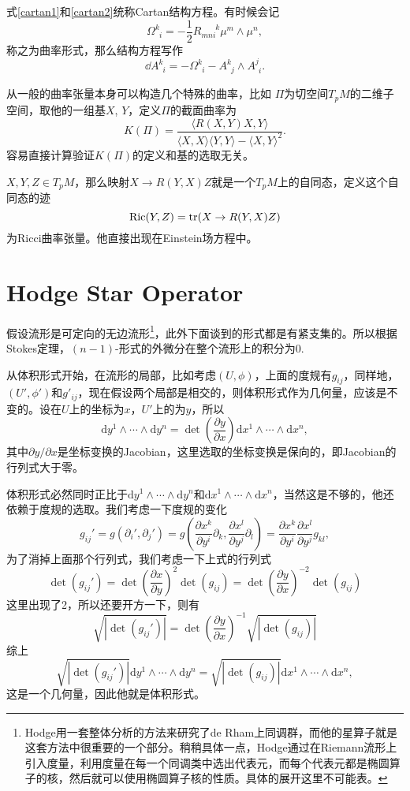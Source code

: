 式\eqref{cartan1}和\eqref{cartan2}统称Cartan结构方程。有时候会记
\[
	\Omega^{k}_{\phantom{k}i}=-\frac{1}{2}R_{mni}^{\phantom{mni}k} \mu^m\wedge\mu^n,
\]
称之为曲率形式，那么结构方程写作
\[
	\dd A^{k}_{\phantom{k}i}=-\Omega^{k}_{\phantom{k}i}-A^{k}_{\phantom{k}j}\wedge A^{j}_{\phantom{j}i}.
\]

从一般的曲率张量本身可以构造几个特殊的曲率，比如
\para $\Pi$为切空间$T_pM$的二维子空间，取他的一组基$X$, $Y$，定义$\Pi$的截面曲率为
\[
	K(\Pi)=\frac{\langle R(X,Y)X,Y\rangle}{\langle X,X\rangle\langle Y,Y \rangle-\langle X,Y \rangle^2}.
\]
容易直接计算验证$K(\Pi)$的定义和基的选取无关。

\para $X,Y,Z\in T_p M$，那么映射$X\to R(Y,X)Z$就是一个$T_p M$上的自同态，定义这个自同态的迹
\[
	\mathrm{Ric}(Y,Z)=\operatorname{tr} (X\to R(Y,X)Z)
\]
为Ricci曲率张量。他直接出现在Einstein场方程中。

\section{Hodge Star Operator}
假设流形是可定向的无边流形\footnote{Hodge用一套整体分析的方法来研究了de Rham上同调群，而他的星算子就是这套方法中很重要的一个部分。稍稍具体一点，Hodge通过在Riemann流形上引入度量，利用度量在每一个同调类中选出代表元，而每个代表元都是椭圆算子的核，然后就可以使用椭圆算子核的性质。具体的展开这里不可能表。}，此外下面谈到的形式都是有紧支集的。所以根据Stokes定理，$(n-1)$-形式的外微分在整个流形上的积分为0.

从体积形式开始，在流形的局部，比如考虑$(U,\phi)$，上面的度规有$g_{ij}$，同样地，$(U',\phi')$和$g'_{ij}$，现在假设两个局部是相交的，则体积形式作为几何量，应该是不变的。设在$U$上的坐标为$x$，$U'$上的为$y$，所以
\[
	\mathrm{d}y^1\wedge \cdots \wedge\mathrm{d}y^n=\det\left(\frac{\partial y}{\partial x}\right)\mathrm{d}x^1\wedge \cdots \wedge \mathrm{d}x^n,
\]
其中$\partial y/\partial x$是坐标变换的Jacobian，这里选取的坐标变换是保向的，即Jacobian的行列式大于零。

体积形式必然同时正比于$\mathrm{d}y^1\wedge \cdots \wedge \mathrm{d}y^n$和$\mathrm{d}x^1\wedge \cdots \wedge \mathrm{d}x^n$，当然这是不够的，他还依赖于度规的选取。我们考虑一下度规的变化
\[
	g_{ij}'=g(\partial_i',\partial_j')=g\left(\frac{\partial x^k}{\partial y^i}\partial_k,\frac{\partial x^l}{\partial y^j}\partial_l\right)=\frac{\partial x^k}{\partial y^i}\frac{\partial x^l}{\partial y^j}g_{kl},
\]
为了消掉上面那个行列式，我们考虑一下上式的行列式
\[
	\det(g_{ij}')=\det\left(\frac{\partial x}{\partial y}\right)^2\det(g_{ij})=\det\left(\frac{\partial y}{\partial x}\right)^{-2}\det(g_{ij})
\]
这里出现了2，所以还要开方一下，则有
\[
	\sqrt{|\det(g_{ij}')|}=\det\left(\frac{\partial y}{\partial x}\right)^{-1}\sqrt{|\det(g_{ij})|}
\]
综上
\[
	\sqrt{|\det(g_{ij}')|}\mathrm{d}y^1\wedge \cdots \wedge \mathrm{d}y^n=\sqrt{|\det(g_{ij})|}\mathrm{d}x^1\wedge \cdots \wedge \mathrm{d}x^n,
\]
这是一个几何量，因此他就是体积形式。

